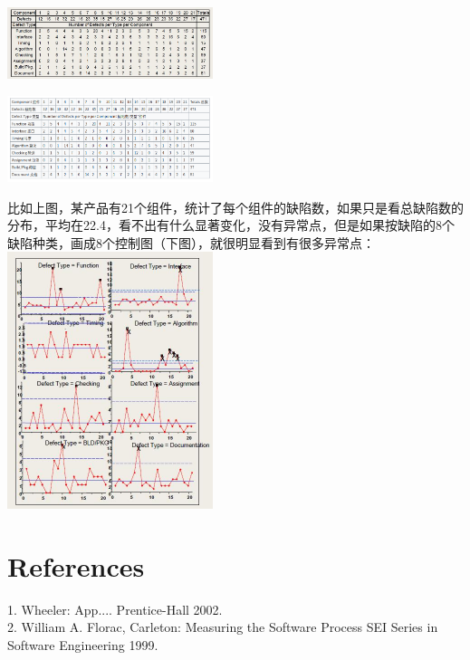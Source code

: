 
\includegraphics[width=6cm]{DAD_p65.jpg}


\includegraphics[width=6cm]{Screenshotfrom2022-12-2821-23-27.png}

比如上图，某产品有21个组件，统计了每个组件的缺陷数，如果只是看总缺陷数的分布，平均在22.4，看不出有什么显著变化，没有异常点，但是如果按缺陷的8个缺陷种类，画成8个控制图（下图），就很明显看到有很多异常点：\\

\includegraphics[width=6cm]{DAD_p67.jpg}


\hypertarget{ux9644ux4ef6}{%
\section{References}\label{ux9644ux4ef6}}


1. Wheeler: App.... Prentice-Hall 2002.\\
2. William A. Florac, Carleton: Measuring the Software Process SEI Series in Software Engineering 1999.\\

